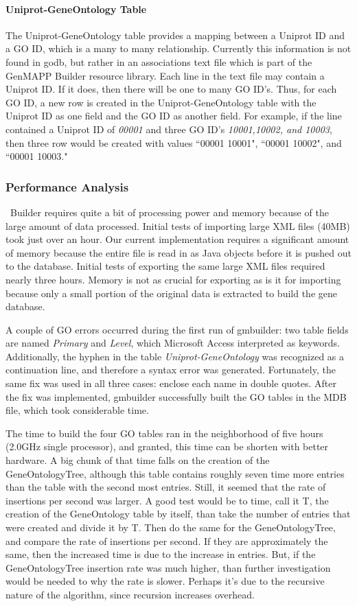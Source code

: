 \paragraph{Uniprot-GeneOntology Table}
The Uniprot-GeneOntology table provides a mapping between a Uniprot ID and a GO ID, which is a many to many relationship.
Currently this information is not found in godb, but rather in an associations text file which is part of the GenMAPP Builder
resource library. Each line in the text file may contain a Uniprot ID. If it does, then there will be one to many GO ID's.
Thus, for each GO ID, a new row is created in the Uniprot-GeneOntology table with the Uniprot ID as one field and the GO ID
as another field. For example, if the line contained a Uniprot ID of \emph{00001} and three GO ID's \emph{10001,10002, and 10003},
then three row would be created with values ``00001 10001", ``00001 10002", and ``00001 10003."

\subsubsection{Performance Analysis}
\genmapp~Builder requires quite a bit of processing power and memory because of the large amount of data processed.  Initial tests of importing large XML files (40MB) took just over an hour.  Our current implementation requires a significant amount of memory because the entire file is read in as Java objects before it is pushed out to the database. Initial tests of exporting the same large XML files required nearly three hours.  Memory is not as crucial for exporting as is it for importing because only a small portion of the original data is extracted to build the \genmapp gene database.

A couple of GO errors occurred during the first run of gmbuilder: two table fields are named \emph{Primary} and \emph{Level}, which
Microsoft Access interpreted as keywords. Additionally, the hyphen in the table \emph{Uniprot-GeneOntology}
was recognized  as a continuation line, and therefore a syntax error was generated. Fortunately, the same fix was used
in all three cases: enclose each name in double quotes. After the fix was implemented, gmbuilder successfully built the
GO tables in the MDB file, which took considerable time.

The time to build the four GO tables ran in the neighborhood of five hours (2.0GHz single processor), and
granted, this time can be shorten with better hardware. A big chunk of that time falls on the creation of the
GeneOntologyTree, although this table contains roughly seven time more entries than the table with the second
most entries. Still, it seemed that the rate of insertions per second was larger.
A good test would be to time, call it T, the creation of the
GeneOntology table by itself, than take the number of entries that were created and divide it by T. Then do the same for the
GeneOntologyTree, and compare the rate of insertions per second. If they are approximately the same, then the increased time
is due to the increase in entries. But, if the GeneOntologyTree insertion rate was much higher, than further investigation would be
needed to why the rate is slower. Perhaps it's due to the recursive nature of the algorithm, since recursion increases overhead.


